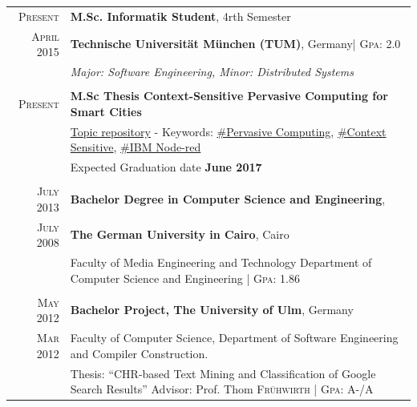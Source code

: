 \documentclass[a4paper,13pt]{article}
\begin{document}
\begin{adjustwidth}{-3cm}{}
\begin{tabular}{r|p{17.5cm}}
		

\textsc{Present} & \textbf{M.Sc. Informatik Student}, 4rth Semester\\ \textsc{April} 2015 & \normalsize\textbf{Technische Universität München (TUM)}, Germany\footnotesize \hfill| \normalsize \textsc{Gpa}: 2.0\\
& \small\emph{Major: Software Engineering, Minor: Distributed Systems}
\\ \multicolumn{2}{c}{} \\

\textsc{Present}&
\textbf{M.Sc Thesis Context-Sensitive Pervasive Computing for Smart Cities}\\
& \href{https://github.com/SalehAly/master-thesis}{Topic repository} - Keywords: \href{https://www.google.de/search?q=Pervasive+Computing}{\#Pervasive Computing}, \href{https://www.google.de/search?q=context+sensitive}{\#Context Sensitive}, \href{nodered.org}{\#IBM Node-red} \\
& Expected Graduation date \textbf{June 2017} 
\\ \multicolumn{2}{c}{} \\


\textsc{July} 2013 & \textbf{Bachelor Degree in Computer Science and Engineering},\\ \textsc{July} 2008& \normalsize\textbf{The German University in Cairo}, Cairo\\
& \small{Faculty of Media Engineering and Technology} \small{Department of Computer Science and Engineering}  \footnotesize \hfill| \normalsize \textsc{Gpa}: 1.86
\\\multicolumn{2}{c}{} \\

\textsc{May} 2012 & \textbf{Bachelor Project, The University of Ulm}, Germany\\
\textsc{Mar} 2012 & \small{Faculty of Computer Science, Department of Software Engineering and} \small{Compiler Construction.}\\ 
& \footnotesize{Thesis: ``CHR-based Text Mining and Classification of Google Search Results''}   \footnotesize{Advisor: Prof. Thom \textsc{Fr{\"u}hwirth}} \hfill| \footnotesize \normalsize \textsc{Gpa}: A-/A 
\\
\end{tabular}

\end{adjustwidth}
\end{document}
